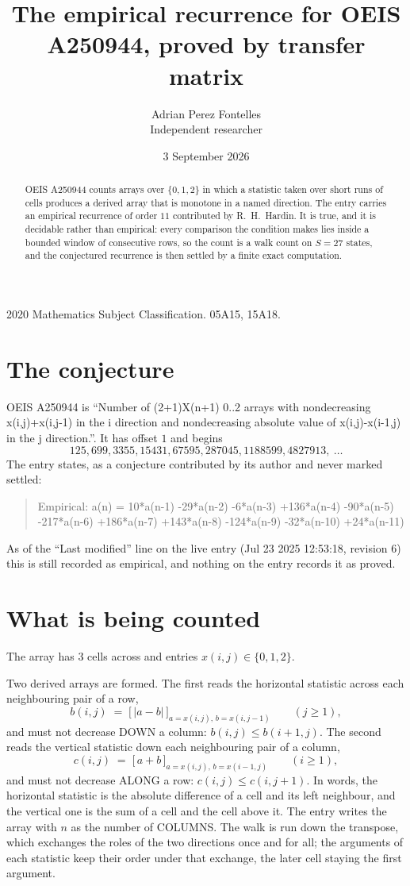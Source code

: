 \documentclass[11pt,a4paper]{article}
\title{The empirical recurrence for OEIS A250944, proved by transfer matrix}
\author{Adrian Perez Fontelles\\ \small Independent researcher}
\date{3 September 2026}
\theoremstyle{plain}
\theoremstyle{definition}
\begin{document}
\maketitle

\begin{abstract}
OEIS A250944 counts arrays over $\{0,1,2\}$ in which a statistic taken over short runs
of cells produces a derived array that is monotone in a named direction. The entry carries an
empirical recurrence of order $11$ contributed by R.~H.~Hardin. It is true, and it is
decidable rather than empirical: every comparison the condition makes lies inside a bounded
window of consecutive rows, so the count is a walk count on $S=27$ states, and the
conjectured recurrence is then settled by a finite exact computation.
\end{abstract}

\noindent\small 2020 Mathematics Subject Classification. 05A15, 15A18.\normalsize

\section{The conjecture}

OEIS A250944 is ``Number of (2+1)X(n+1) 0..2 arrays with nondecreasing x(i,j)+x(i,j-1) in the i direction and nondecreasing absolute value of x(i,j)-x(i-1,j) in the j direction.''. It has offset $1$ and begins
\[
125, 699, 3355, 15431, 67595, 287045, 1188599, 4827913,\ \dots
\]
The entry states, as a conjecture contributed by its author and never marked settled:
\begin{quote}
Empirical: a(n) = 10*a(n-1) -29*a(n-2) -6*a(n-3) +136*a(n-4) -90*a(n-5) -217*a(n-6) +186*a(n-7) +143*a(n-8) -124*a(n-9) -32*a(n-10) +24*a(n-11)
\end{quote}
As of the ``Last modified'' line on the live entry (Jul 23 2025 12:53:18, revision 6) this is still
recorded as empirical, and nothing on the entry records it as proved.

\section{What is being counted}

The array has $3$ cells across and entries $x(i,j)\in\{0,1,2\}$.

Two derived arrays are formed. The first reads the horizontal statistic across each
neighbouring pair of a row,
\[
b(i,j)\;=\;\bigl[\,\lvert a-b\rvert\,\bigr]_{a=x(i,j),\,b=x(i,j-1)}\qquad (j\ge1),
\]
and must not decrease DOWN a column: $b(i,j)\le b(i{+}1,j)$. The second reads the vertical
statistic down each neighbouring pair of a column,
\[
c(i,j)\;=\;\bigl[\,a+b\,\bigr]_{a=x(i,j),\,b=x(i{-}1,j)}\qquad (i\ge1),
\]
and must not decrease ALONG a row: $c(i,j)\le c(i,j{+}1)$. In words, the horizontal statistic
is the absolute difference of a cell and its left neighbour, and the vertical one is
the sum of a cell and the cell above it. The entry writes the array with $n$ as the number of COLUMNS. The walk is run down the transpose, which exchanges the roles of the two directions once and for all; the arguments of each statistic keep their order under that exchange, the later cell staying the first argument.
\end{document}
